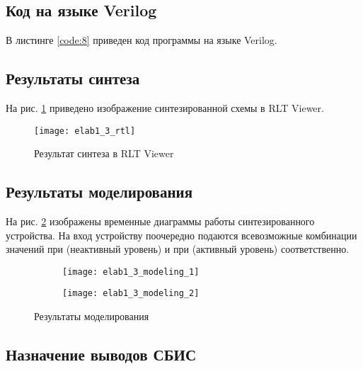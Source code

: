 \subsection{Код на языке Verilog}

В листинге \ref{code:8} приведен код программы на языке Verilog.



\subsection{Результаты синтеза}

На рис. \ref{fig:elab1_3_rtl} приведено изображение синтезированной схемы в RLT Viewer.

\begin{figure}[H]
\begin{center}
	\texttt{[image: elab1\_3\_rtl]}
	\caption{Результат синтеза в RLT Viewer}
	\label{fig:elab1_3_rtl}
\end{center}
\end{figure}

\subsection{Результаты моделирования}
\label{sec:elab1_3_modeling}

На рис. \ref{fig:elab1_3_modeling} изображены временные диаграммы работы синтезированного устройства. На вход устройству поочередно подаются всевозможные комбинации значений  при  (неактивный уровень) и при  (активный уровень) соответственно.
\begin{figure}[H]
\begin{center}
	\begin{subfigure}[b]{\textwidth}
		\texttt{[image: elab1\_3\_modeling\_1]}
	\end{subfigure}
	\begin{subfigure}[b]{\textwidth}
		\texttt{[image: elab1\_3\_modeling\_2]}
	\end{subfigure}
	\caption{Результаты моделирования}
	\label{fig:elab1_3_modeling}
\end{center}
\end{figure}

\subsection{Назначение выводов СБИС}

